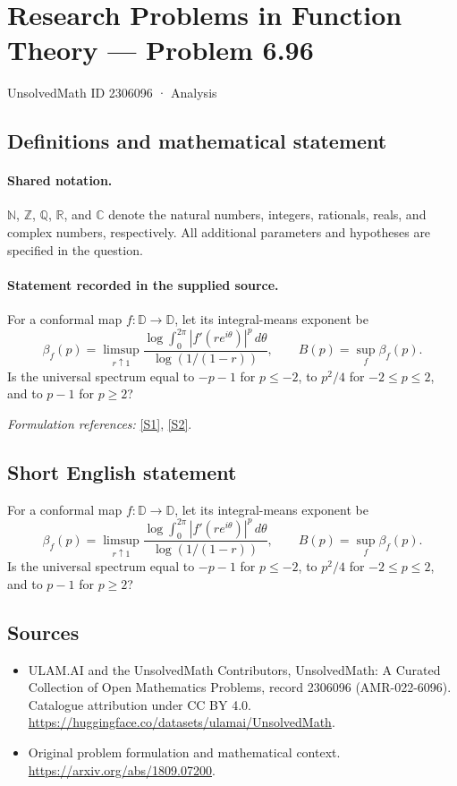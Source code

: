 \documentclass[11pt]{article}
\newcommand{\sref}[2]{\hyperlink{source:#1:#2}{[S#2]}}
\begin{document}
\setcounter{section}{2306095}
\section{Research Problems in Function Theory — Problem 6.96}\label{2306096}
{\small UnsolvedMath ID 2306096 · Analysis}
\subsection{Definitions and mathematical statement}

\paragraph{Shared notation.}$\mathbb N$, $\mathbb Z$, $\mathbb Q$, $\mathbb R$, and $\mathbb C$ denote the natural numbers, integers, rationals, reals, and complex numbers, respectively. All additional parameters and hypotheses are specified in the question.


\paragraph{Statement recorded in the supplied source.}
For a conformal map $f:\mathbb D\to\mathbb D$, let its integral-means exponent be
\[\beta_f(p)=\limsup_{r\uparrow1}\frac{\log\int_0^{2\pi}|f'(re^{i\theta})|^p\,d\theta}{\log(1/(1-r))},\qquad B(p)=\sup_f\beta_f(p).\]
Is the universal spectrum equal to $-p-1$ for $p\leq-2$, to $p^2/4$ for $-2\leq p\leq2$, and to $p-1$ for $p\geq2$?
\par\smallskip\textit{Formulation references:} \sref{2306096}{1}, \sref{2306096}{2}.
\subsection{Short English statement}
For a conformal map $f:\mathbb D\to\mathbb D$, let its integral-means exponent be
\[\beta_f(p)=\limsup_{r\uparrow1}\frac{\log\int_0^{2\pi}|f'(re^{i\theta})|^p\,d\theta}{\log(1/(1-r))},\qquad B(p)=\sup_f\beta_f(p).\]
Is the universal spectrum equal to $-p-1$ for $p\leq-2$, to $p^2/4$ for $-2\leq p\leq2$, and to $p-1$ for $p\geq2$?
\subsection{Sources}
\begin{itemize}
\item[\hypertarget{source:2306096:1}{S1}] ULAM.AI and the UnsolvedMath Contributors, UnsolvedMath: A Curated Collection of Open Mathematics Problems, record 2306096 (AMR-022-6096). Catalogue attribution under CC BY 4.0.
\url{https://huggingface.co/datasets/ulamai/UnsolvedMath}.
\item[\hypertarget{source:2306096:2}{S2}] Original problem formulation and mathematical context.
\url{https://arxiv.org/abs/1809.07200}.
\end{itemize}
\label{end:2306096}
\end{document}
